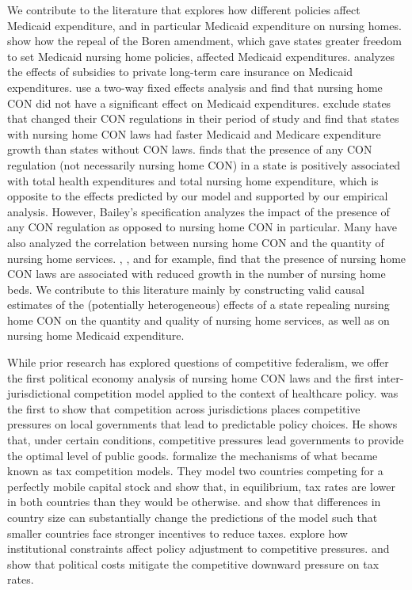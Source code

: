 \documentclass[../Main.tex]{subfiles}
\begin{document}
We contribute to the literature that explores how different policies affect Medicaid expenditure, and in particular Medicaid expenditure on nursing homes. \citet{grabowski2004recent} show how the repeal of the Boren amendment, which gave states greater freedom to set Medicaid nursing home policies, affected Medicaid expenditures. \citet{goda2011impact} analyzes the effects of subsidies to private long-term care insurance on Medicaid expenditures. \citet{grabowski2003effects} use a two-way fixed effects analysis and find that nursing home CON did not have a significant effect on Medicaid expenditures. \citet{rahman2016impact} exclude states that changed their CON regulations in their period of study and find that states with nursing home CON laws had faster Medicaid and Medicare expenditure growth than states without CON laws. \citet{bailey2019can} finds that the presence of any CON regulation (not necessarily nursing home CON) in a state is positively associated with total health expenditures and total nursing home expenditure, which is opposite to the effects predicted by our model and supported by our empirical analysis. However, Bailey’s specification analyzes the impact of the presence of any CON regulation as opposed to nursing home CON in particular. Many have also analyzed the correlation between nursing home CON and the quantity of nursing home services. \citet{harrington1997effect}, \citet{swan1991certificate}, and \citet{zinn1994market} for example, find that the presence of nursing home CON laws are associated with reduced growth in the number of nursing home beds. We contribute to this literature mainly by constructing valid causal estimates of the (potentially heterogeneous) effects of a state repealing nursing home CON on the quantity and quality of nursing home services, as well as on nursing home Medicaid expenditure.   

While prior research has explored questions of competitive federalism, we offer the first political economy analysis of nursing home CON laws and the first inter-jurisdictional competition model applied to the context of healthcare policy. \citet{tiebout1956pure} was the first to show that competition across jurisdictions places competitive pressures on local governments that lead to predictable policy choices. He shows that, under certain conditions, competitive pressures lead governments to provide the optimal level of public goods. \citet{zodrow1986pigou} formalize the mechanisms of what became known as tax competition models. They model two countries competing for a perfectly mobile capital stock and show that, in equilibrium, tax rates are lower in both countries than they would be otherwise. \citet{bucovetsky1991asymmetric} and \citet{kanbur1993jeux} show that differences in country size can substantially change the predictions of the model such that smaller countries face stronger incentives to reduce taxes. \citet{genschel2002globalization} explore how institutional constraints affect policy adjustment to competitive pressures. \citet{basinger2004remodeling} and \citet{plumper2009there} show that political costs mitigate the competitive downward pressure on tax rates. 
\end{document}
